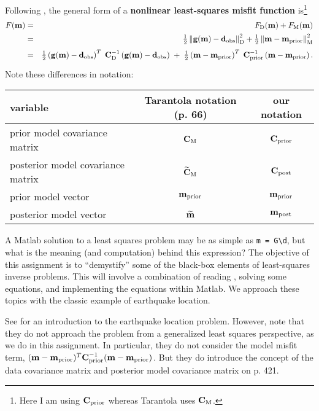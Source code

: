 \documentclass[11pt,titlepage,fleqn]{article}
\begin{document}
Following \citet[][p.~205]{Tarantola2005}, the general form of a {\bf nonlinear least-squares misfit function} is\footnote{Here I am using $\mbox{${\bf C}$}_{\rm prior}$ whereas Tarantola uses $\mbox{${\bf C}$}_{\rm M}$.}
%
\begin{eqnarray}
\misfitvar(\bem) &=& \misfitvar_{\rm D}(\bem) + \misfitvar_{\rm M}(\bem) 
\\
&=& \hlf \left\| \bg(\bem) - \bd_{\rm obs} \right\|^2_{\rm D} + \hlf \left\| \bem - \mprior \right\|^2_{\rm M}
\nonumber \\
&=& \hlf \left( \bg(\bem) - \bd_{\rm obs}\right)^T \; \covdi \left( \bg(\bem) - \bd_{\rm obs} \right)
\;+\; \hlf \left( \bem - \mprior \right)^T \; \cpriori \left( \bem - \mprior \right).
\nonumber
\label{misfit_gen}
\end{eqnarray}
%
Note these differences in notation:

\vspace{0.2cm}
\begin{tabular}{l|c|c}
\hline
variable                            & Tarantola notation (p. 66)       & our notation \\ \hline
prior model covariance matrix       & $\mbox{${\bf C}$}_{\rm M}$                     & $\mbox{${\bf C}$}_{\rm prior}$    \\ \hline
posterior model covariance matrix   & $\widetilde{\mbox{${\bf C}$}}_{\rm M}$         & $\mbox{${\bf C}$}_{\rm post}$     \\ \hline
prior model vector                  & $\mbox{${\bf m}$}_{\rm prior}$                        & $\mbox{${\bf m}$}_{\rm prior}$     \\ \hline
posterior model vector              & $\widetilde{\mbox{${\bf m}$}}$               & $\mbox{${\bf m}$}_{\rm post}$     \\ \hline
\hline
\end{tabular}
\vspace{0.2cm}

A Matlab solution to a least squares problem may be as simple as \verb+m = G\d+, but what is the meaning (and computation) behind this expression? The objective of this assignment is to ``demystify'' some of the black-box elements of least-squares inverse problems. This will involve a combination of reading \citet{Tarantola2005}, solving some equations, and implementing the equations within Matlab. We approach these topics with the classic example of earthquake location.

See \citet[][Chapter 7]{SteinWysession} for an introduction to the earthquake location problem. However, note that they do not approach the problem from a generalized least squares perspective, as we do in this assignment. In particular, they do not consider the model misfit term, $(\mbox{${\bf m}$}-\mbox{${\bf m}$}_{\rm prior})^T \mbox{${\bf C}$}_{\rm prior}^{-1} (\mbox{${\bf m}$}-\mbox{${\bf m}$}_{\rm prior})$. But they do introduce the concept of the data covariance matrix and posterior model covariance matrix on p. 421.
\end{document}
